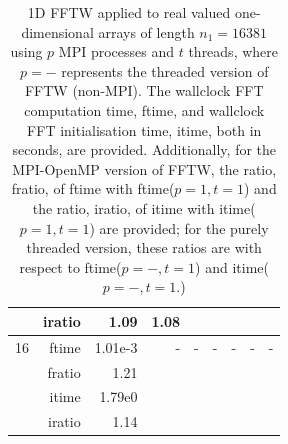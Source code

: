 \documentclass[a4]{article}
\begin{document}
\begin{table}
\begin{center}
\begin{tabular}{|r|r|r|r|r|r|r|r|r|}
      & iratio &  1.09 &   1.08  &  & & & & \\ \hline
    16 & ftime  & 1.01e-3    & - & - & - & - & - & - \\ 
     & fratio &  1.21   &  &  &  &  &  &  \\
      & itime &   1.79e0  & & & & & & \\
      & iratio & 1.14   & & & & & & \\ \hline
\end{tabular}
\caption{1D FFTW applied to real valued one-dimensional arrays of length $n_1=16381$ using $p$ MPI processes and $t$ threads, where $p=-$ represents the threaded version of FFTW (non-MPI). The wallclock FFT computation time, ftime, and wallclock FFT initialisation time, itime, both in seconds, are provided. Additionally, for the MPI-OpenMP version of FFTW, the ratio, fratio, of ftime  with ftime($p=1,t=1$) and the ratio, iratio, of itime  with itime($p=1,t=1$) are provided; for the purely threaded version, these ratios are with respect to ftime($p=-,t=1$) and itime($p=-,t=1$.) }\label{Tbl:FFT1d16381}
\end{center}
\end{table}
\end{document}
